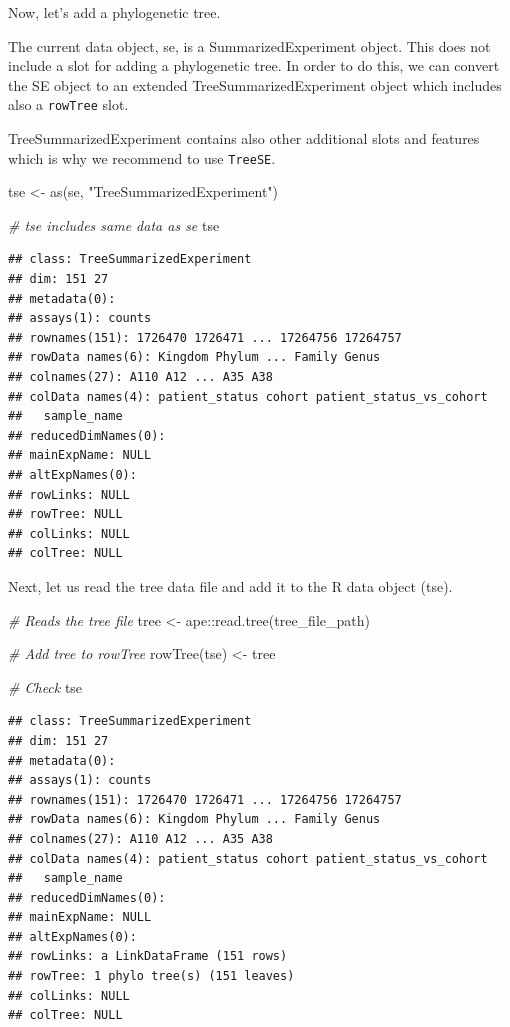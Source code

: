 \documentclass[
]{book}
\newenvironment{Shaded}{\begin{snugshade}}{\end{snugshade}}
\newcommand{\CommentTok}[1]{\textcolor[rgb]{0.56,0.35,0.01}{\textit{#1}}}
\newcommand{\FunctionTok}[1]{\textcolor[rgb]{0.00,0.00,0.00}{#1}}
\newcommand{\NormalTok}[1]{#1}
\newcommand{\OtherTok}[1]{\textcolor[rgb]{0.56,0.35,0.01}{#1}}
\newcommand{\SpecialCharTok}[1]{\textcolor[rgb]{0.00,0.00,0.00}{#1}}
\newcommand{\StringTok}[1]{\textcolor[rgb]{0.31,0.60,0.02}{#1}}
\begin{document}
Now, let's add a phylogenetic tree.

The current data object, se, is a SummarizedExperiment object. This
does not include a slot for adding a phylogenetic tree. In order to do
this, we can convert the SE object to an extended TreeSummarizedExperiment
object which includes also a \texttt{rowTree} slot.

TreeSummarizedExperiment contains also other additional slots and features which
is why we recommend to use \texttt{TreeSE}.

\begin{Shaded}
\begin{Highlighting}[]
\NormalTok{tse }\OtherTok{\textless{}{-}} \FunctionTok{as}\NormalTok{(se, }\StringTok{"TreeSummarizedExperiment"}\NormalTok{)}

\CommentTok{\# tse includes same data as se}
\NormalTok{tse}
\end{Highlighting}
\end{Shaded}

\begin{verbatim}
## class: TreeSummarizedExperiment 
## dim: 151 27 
## metadata(0):
## assays(1): counts
## rownames(151): 1726470 1726471 ... 17264756 17264757
## rowData names(6): Kingdom Phylum ... Family Genus
## colnames(27): A110 A12 ... A35 A38
## colData names(4): patient_status cohort patient_status_vs_cohort
##   sample_name
## reducedDimNames(0):
## mainExpName: NULL
## altExpNames(0):
## rowLinks: NULL
## rowTree: NULL
## colLinks: NULL
## colTree: NULL
\end{verbatim}

Next, let us read the tree data file and add it to the R data object (tse).

\begin{Shaded}
\begin{Highlighting}[]
\CommentTok{\# Reads the tree file}
\NormalTok{tree }\OtherTok{\textless{}{-}}\NormalTok{ ape}\SpecialCharTok{::}\FunctionTok{read.tree}\NormalTok{(tree\_file\_path)}

\CommentTok{\# Add tree to rowTree}
\FunctionTok{rowTree}\NormalTok{(tse) }\OtherTok{\textless{}{-}}\NormalTok{ tree}

\CommentTok{\# Check}
\NormalTok{tse}
\end{Highlighting}
\end{Shaded}

\begin{verbatim}
## class: TreeSummarizedExperiment 
## dim: 151 27 
## metadata(0):
## assays(1): counts
## rownames(151): 1726470 1726471 ... 17264756 17264757
## rowData names(6): Kingdom Phylum ... Family Genus
## colnames(27): A110 A12 ... A35 A38
## colData names(4): patient_status cohort patient_status_vs_cohort
##   sample_name
## reducedDimNames(0):
## mainExpName: NULL
## altExpNames(0):
## rowLinks: a LinkDataFrame (151 rows)
## rowTree: 1 phylo tree(s) (151 leaves)
## colLinks: NULL
## colTree: NULL
\end{verbatim}
\end{document}

